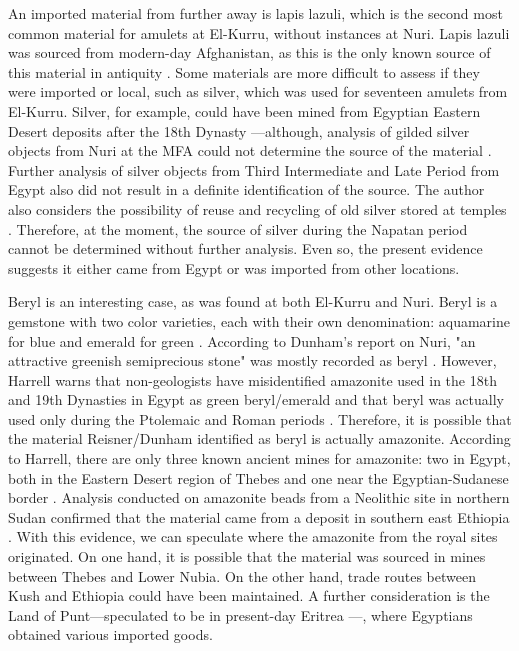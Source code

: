 An imported material from further away is lapis lazuli, which is the second most common material for amulets at El-Kurru, without instances at Nuri. Lapis lazuli was sourced from modern-day Afghanistan, as this is the only known source of this material in antiquity \parencites[p.~869]{harrellArchaeologyGeologyAncient2024}. Some materials are more difficult to assess if they were imported or local, such as silver, which was used for seventeen amulets from El-Kurru. Silver, for example, could have been mined from Egyptian Eastern Desert deposits after the 18th Dynasty \parencites[p.~878]{harrellArchaeologyGeologyAncient2024}---although, analysis of gilded silver objects from Nuri at the MFA could not determine the source of the material \parencites{gänsickeGildedSilverAncient2000}. Further analysis of silver objects from Third Intermediate and Late Period from Egypt also did not result in a definite identification of the source. The author also considers the possibility of reuse and recycling of old silver stored at temples \parencites[p.~59-60]{jurmanSilverTreasuryHerishef2015}. Therefore, at the moment, the source of silver during the Napatan period cannot be determined without further analysis. Even so, the present evidence suggests it either came from Egypt or was imported from other locations.


Beryl is an interesting case, as was found at both El-Kurru and Nuri. Beryl is a gemstone with two color varieties, each with their own denomination: aquamarine for blue and emerald for green \parencites[p.~758]{harrellArchaeologyGeologyAncient2024}. According to Dunham's report on Nuri, "an attractive greenish semiprecious stone" was mostly recorded as beryl \parencites[p.~5]{dunhamNuri1955}. However, Harrell warns that non-geologists have misidentified amazonite used in the 18th and 19th Dynasties in Egypt as green beryl/emerald and that beryl was actually used only during the Ptolemaic and Roman periods \parencites[p.~758, 807]{jurmanSilverTreasuryHerishef2015}. Therefore, it is possible that the material Reisner/Dunham identified as beryl is actually amazonite. According to Harrell, there are only three known ancient mines for amazonite: two in Egypt, both in the Eastern Desert region of Thebes and one near the Egyptian-Sudanese border \parencites[p.~795-802]{harrellArchaeologyGeologyAncient2024}. Analysis conducted on amazonite beads from a Neolithic site in northern Sudan confirmed that the material came from a deposit in southern east Ethiopia \parencites[p.~1202]{zerboniLongdistanceExchangeAmazonite2018}. With this evidence, we can speculate where the amazonite from the royal sites originated. On one hand, it is possible that the material was sourced in mines between Thebes and Lower Nubia. On the other hand, trade routes between Kush and Ethiopia could have been maintained. A further consideration is the Land of Punt---speculated to be in present-day Eritrea \parencites{grathwolAdulisTransshipmentBaboons2023}---, where Egyptians obtained various imported goods.


